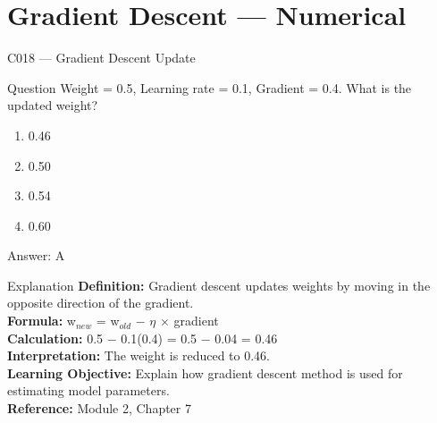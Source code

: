 \documentclass[aspectratio=169,8pt]{beamer}
\begin{document}
	\section{Gradient Descent --- Numerical}
	
	\begin{frame}{C018 --- Gradient Descent Update}
		\begin{block}{Question}
			Weight = 0.5, Learning rate = 0.1, Gradient = 0.4. What is the updated weight?
			\begin{enumerate}
				\item 0.46
				\item 0.50
				\item 0.54
				\item 0.60
			\end{enumerate}
		\end{block}
		\begin{exampleblock}{Answer: A}\end{exampleblock}
		\begin{block}{Explanation}
			\textbf{Definition:} Gradient descent updates weights by moving in the opposite direction of the gradient.\\
			\textbf{Formula:} w$_{new}$ = w$_{old}$ $-$ $\eta$ $\times$ gradient\\
			\textbf{Calculation:} 0.5 $-$ 0.1(0.4) = 0.5 $-$ 0.04 = 0.46\\
			\textbf{Interpretation:} The weight is reduced to 0.46.\\
			\textbf{Learning Objective:} Explain how gradient descent method is used for estimating model parameters.\\
			\textbf{Reference:} Module 2, Chapter 7
		\end{block}
	\end{frame}
	
\end{document}
